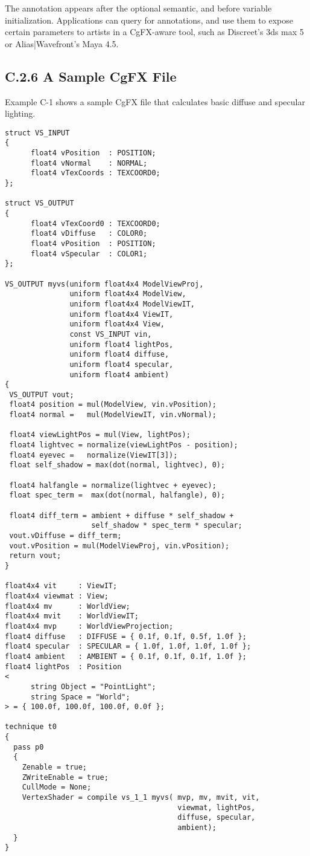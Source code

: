 \documentclass[../main.tex]{subfiles}
\begin{document}
The annotation appears after the optional semantic, and before variable initialization. Applications can query for annotations, and use them to expose certain parameters to artists in a CgFX-aware tool, such as Discreet's 3ds max 5 or Alias|Wavefront's Maya 4.5.

\subsection{C.2.6 A Sample CgFX File}

Example C-1 shows a sample CgFX file that calculates basic diffuse and specular lighting.

\FloatBarrier
\begin{lstlisting}[caption=Example C-1. A Sample CgFX File]
struct VS_INPUT
{
      float4 vPosition  : POSITION;
      float4 vNormal    : NORMAL;
      float4 vTexCoords : TEXCOORD0;
};

struct VS_OUTPUT
{
      float4 vTexCoord0 : TEXCOORD0;
      float4 vDiffuse   : COLOR0;
      float4 vPosition  : POSITION;
      float4 vSpecular  : COLOR1;
};

VS_OUTPUT myvs(uniform float4x4 ModelViewProj,
               uniform float4x4 ModelView,
               uniform float4x4 ModelViewIT,
               uniform float4x4 ViewIT,
               uniform float4x4 View,
               const VS_INPUT vin,
               uniform float4 lightPos,
               uniform float4 diffuse,
               uniform float4 specular,
               uniform float4 ambient)
{
 VS_OUTPUT vout;
 float4 position = mul(ModelView, vin.vPosition);
 float4 normal =   mul(ModelViewIT, vin.vNormal);

 float4 viewLightPos = mul(View, lightPos);
 float4 lightvec = normalize(viewLightPos - position);
 float4 eyevec =   normalize(ViewIT[3]);
 float self_shadow = max(dot(normal, lightvec), 0);

 float4 halfangle = normalize(lightvec + eyevec);
 float spec_term =  max(dot(normal, halfangle), 0);

 float4 diff_term = ambient + diffuse * self_shadow +
                    self_shadow * spec_term * specular;
 vout.vDiffuse = diff_term;
 vout.vPosition = mul(ModelViewProj, vin.vPosition);
 return vout;
}

float4x4 vit     : ViewIT;
float4x4 viewmat : View;
float4x4 mv      : WorldView;
float4x4 mvit    : WorldViewIT;
float4x4 mvp     : WorldViewProjection;
float4 diffuse   : DIFFUSE = { 0.1f, 0.1f, 0.5f, 1.0f };
float4 specular  : SPECULAR = { 1.0f, 1.0f, 1.0f, 1.0f };
float4 ambient   : AMBIENT = { 0.1f, 0.1f, 0.1f, 1.0f };
float4 lightPos  : Position
<
      string Object = "PointLight";
      string Space = "World";
> = { 100.0f, 100.0f, 100.0f, 0.0f };

technique t0
{
  pass p0
  {
    Zenable = true;
    ZWriteEnable = true;
    CullMode = None;
    VertexShader = compile vs_1_1 myvs( mvp, mv, mvit, vit,
                                        viewmat, lightPos,
                                        diffuse, specular,
                                        ambient);
  }
}
\end{lstlisting}
\FloatBarrier
\end{document}
